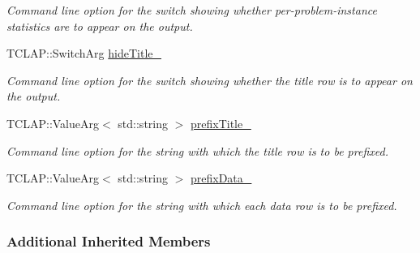 \begin{DoxyCompactItemize}
\begin{DoxyCompactList}\small\item\em Command line option for the switch showing whether per-\/problem-\/instance statistics are to appear on the output. \end{DoxyCompactList}\item 
T\+C\+L\+A\+P\+::\+Switch\+Arg \hyperlink{structslb_1_1core_1_1commandLine_1_1CommandLine_aafd86c8565922240a0e7adf3040b8fa1}{hide\+Title\+\_\+}\hypertarget{structslb_1_1core_1_1commandLine_1_1CommandLine_aafd86c8565922240a0e7adf3040b8fa1}{}\label{structslb_1_1core_1_1commandLine_1_1CommandLine_aafd86c8565922240a0e7adf3040b8fa1}

\begin{DoxyCompactList}\small\item\em Command line option for the switch showing whether the title row is to appear on the output. \end{DoxyCompactList}\item 
T\+C\+L\+A\+P\+::\+Value\+Arg$<$ std\+::string $>$ \hyperlink{structslb_1_1core_1_1commandLine_1_1CommandLine_a2fd89f93aa659f5f0ddfafc9711f15a0}{prefix\+Title\+\_\+}\hypertarget{structslb_1_1core_1_1commandLine_1_1CommandLine_a2fd89f93aa659f5f0ddfafc9711f15a0}{}\label{structslb_1_1core_1_1commandLine_1_1CommandLine_a2fd89f93aa659f5f0ddfafc9711f15a0}

\begin{DoxyCompactList}\small\item\em Command line option for the string with which the title row is to be prefixed. \end{DoxyCompactList}\item 
T\+C\+L\+A\+P\+::\+Value\+Arg$<$ std\+::string $>$ \hyperlink{structslb_1_1core_1_1commandLine_1_1CommandLine_af251cbd553a5150c57dcfb25c1bc3a8c}{prefix\+Data\+\_\+}\hypertarget{structslb_1_1core_1_1commandLine_1_1CommandLine_af251cbd553a5150c57dcfb25c1bc3a8c}{}\label{structslb_1_1core_1_1commandLine_1_1CommandLine_af251cbd553a5150c57dcfb25c1bc3a8c}

\begin{DoxyCompactList}\small\item\em Command line option for the string with which each data row is to be prefixed. \end{DoxyCompactList}\end{DoxyCompactItemize}
\subsubsection*{Additional Inherited Members}


